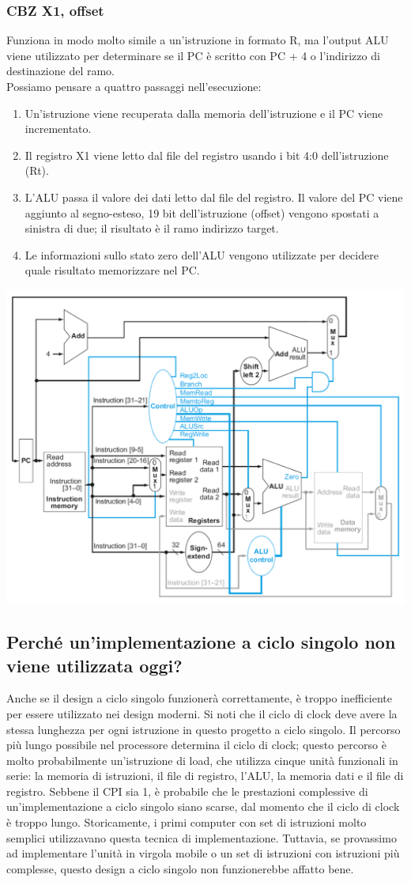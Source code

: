 \documentclass[12pt,a4paper]{article}
\begin{document}
\subsubsection{CBZ X1, offset}
Funziona in modo molto simile a un'istruzione in formato R, ma l'output ALU viene utilizzato per determinare se il PC è scritto con PC + 4 o l'indirizzo di destinazione del ramo.\\
Possiamo pensare a quattro passaggi nell'esecuzione:
\begin{enumerate}
\item Un'istruzione viene recuperata dalla memoria dell'istruzione e il PC viene incrementato.
\item Il registro X1 viene letto dal file del registro usando i bit 4:0 dell'istruzione (Rt).
\item L'ALU passa il valore dei dati letto dal file del registro. Il valore del PC viene aggiunto al segno-esteso, 19 bit dell'istruzione (offset) vengono spostati a sinistra di due; il risultato è il ramo indirizzo target.
\item Le informazioni sullo stato zero dell'ALU vengono utilizzate per decidere quale risultato memorizzare nel PC.
\end{enumerate}
\begin{center}
\includegraphics[width=0.6\columnwidth]{img/cbz_x1.png}
\end{center}

\subsection{Perché un'implementazione a ciclo singolo non viene utilizzata oggi?}
Anche se il design a ciclo singolo funzionerà correttamente, è troppo inefficiente per essere utilizzato nei design moderni. Si noti che il ciclo di clock deve avere la stessa lunghezza per ogni istruzione in questo progetto a ciclo singolo. Il percorso più lungo possibile nel processore determina il ciclo di clock; questo percorso è molto probabilmente un'istruzione di load, che utilizza cinque unità funzionali in serie: la memoria di istruzioni, il file di registro, l'ALU, la memoria dati e il file di registro.
Sebbene il CPI sia 1, è probabile che le prestazioni complessive di un'implementazione a ciclo singolo siano scarse, dal momento che il ciclo di clock è troppo lungo. Storicamente, i primi computer con set di istruzioni molto semplici utilizzavano questa tecnica di implementazione. Tuttavia, se provassimo ad implementare l'unità in virgola mobile o un set di istruzioni con istruzioni più complesse, questo design a ciclo singolo non funzionerebbe affatto bene.
\end{document}

